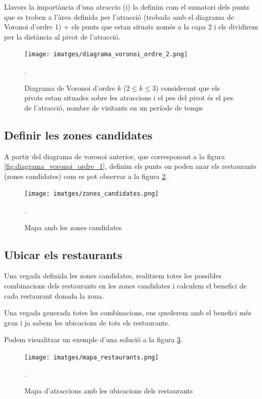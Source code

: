 \documentclass[12pt]{article}
\begin{document}
Llavors la importància d'una atraccio (i) la definim com el sumatori dels punts que es troben a l'àrea definida per l’atracció (trobada amb el diagrama de Voronoi d'ordre 1) + els punts que estan situats només a la capa 2 i els dividirem per la distància al pivot de l'atracció.

\begin{figure}[h!]
	\centering
	\texttt{[image: imatges/diagrama\_voronoi\_ordre\_2.png]}\par\vspace{1cm}
	\caption{Diagrama de Voronoi d'ordre $k$ ($2 \le k \le 3$) considerant que els pivots estan situades sobre les atraccions i el pes del pivot és el pes de l'atracció, nombre de visitants en un període de temps}.
	\label{fig:diagrama_voronoi_ordre_2}
\end{figure}

\subsection{Definir les zones candidates}
A partir del diagrama de voronoi anterior, que corresponont a la figura \ref{fig:diagrama_voronoi_ordre_1}, definim els punts on poden anar els restaurants (zones candidates) com es pot observar a la figura \ref{fig:zones_candidates}.

\begin{figure}[h!]
	\centering
	\texttt{[image: imatges/zones\_candidates.png]}\par\vspace{1cm}
	\caption{Mapa amb les zones candidates}.
	\label{fig:zones_candidates}
\end{figure}

\subsection{Ubicar els restaurants}

Una vegada definida les zones candidates, realitzem totes les possibles combinacions dels restaurants en les zones candidates i calculem el benefici de cada restaurant donada la zona. 

Una vegada generada totes les combinacions, ens quederem amb el benefici més gran i ja sabem les ubicacions de tots els restaurants.

Podem visualitzar un exemple d'una solució a la figura \ref{fig:mapa_restaurants}.

\begin{figure}[h!]
	\centering
	\texttt{[image: imatges/mapa\_restaurants.png]}\par\vspace{1cm}
	\caption{Mapa d'atraccions amb les ubicacions dels restaurants}.
	\label{fig:mapa_restaurants}
\end{figure}
\end{document}
